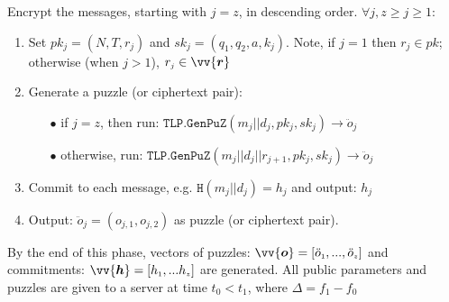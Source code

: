 \begin{enumerate}[leftmargin=.4cm]
Encrypt the  messages, starting with $j=z$, in descending order. $\forall j, z\geq j \geq 1:$
\begin{enumerate}
\item\label{set-pk-in-loop} Set $pk_{\scriptscriptstyle j}=(N,T,r_{\scriptscriptstyle j})$ and $sk_{\scriptscriptstyle j}=(q_{\scriptscriptstyle 1},q_{\scriptscriptstyle 2},a,k_{\scriptscriptstyle j})$. Note, if $j=1$ then $r_{\scriptscriptstyle j} \in pk$; otherwise (when $j>1$), $r_{\scriptscriptstyle j} \in \vv{\bm{r}}$


\item\label{call-RTLP-GenPuz} Generate a puzzle (or ciphertext pair): 
\begin{itemize}
\item[$\bullet$]  if $j=z$, then run: $\mathtt{TLP.GenPuZ}(m_{\scriptscriptstyle j}||d_{\scriptscriptstyle j},pk_{\scriptscriptstyle j},sk_{\scriptscriptstyle j})\rightarrow \ddot{o}_{\scriptscriptstyle j}$
 
\item[$\bullet$]  otherwise, run: $\mathtt{TLP.GenPuZ}(m_{\scriptscriptstyle j}||d_{\scriptscriptstyle j}||r_{\scriptscriptstyle j+1},pk_{\scriptscriptstyle j},sk_{\scriptscriptstyle j})\rightarrow \ddot{o}_{\scriptscriptstyle j}$
\end{itemize}


\item\label{commit-} Commit to each message, e.g. $\mathtt{H}(m_{\scriptscriptstyle j}||d_{\scriptscriptstyle j})=h_{\scriptscriptstyle j}$ and output:  $h_{\scriptscriptstyle j}$ 
 
\item Output: $\ddot{o}_{\scriptscriptstyle j}=(o_{\scriptscriptstyle j,1},o_{\scriptscriptstyle j,2})$ as puzzle (or ciphertext pair). 

\end{enumerate}
By the end of this phase,  vectors of puzzles: $\vv{\bm{o}}=[\ddot{o}_{\scriptscriptstyle 1},..., \ddot{o}_{\scriptscriptstyle z}]$ and commitments: $\vv{\bm{h}}=[h_{\scriptscriptstyle 1},...h_{\scriptscriptstyle z}]$ are generated. All public parameters and puzzles are given to a server at time $t_{\scriptscriptstyle 0}<t_{\scriptscriptstyle1}$, where  $\Delta=f_{\scriptscriptstyle 1}-f_{\scriptscriptstyle 0}$ %





\end{enumerate}
